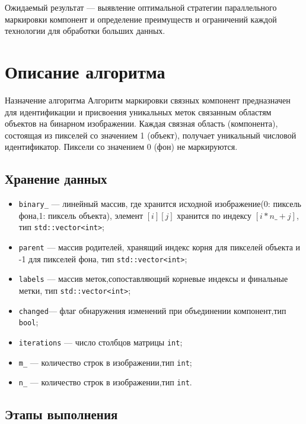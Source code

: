 \documentclass[12pt]{extarticle}
\begin{document}
Ожидаемый результат — выявление оптимальной стратегии параллельного маркировки компонент и определение преимуществ и ограничений каждой технологии для обработки больших данных.


\section{Описание алгоритма}

\hspace*{1.25cm}Назначение алгоритма Алгоритм маркировки связных компонент предназначен для идентификации и присвоения уникальных меток связанным областям объектов на бинарном изображении. Каждая связная область (компонента), состоящая из пикселей со значением 1 (объект), получает уникальный числовой идентификатор. Пиксели со значением 0 (фон) не маркируются.

\subsection{Хранение данных}

\begin{itemize}
    \item \texttt{binary\_} — линейный массив, где хранится исходной изображение(0: пиксель фона,1: пиксель объекта), элемент  $[i][j]$ хранится по индексу $[i * n\_ + j]$, тип  \texttt{std::vector<int>}; \\[-0.9cm]
    \item \texttt{parent} — массив родителей, хранящий индекс корня для пикселей объекта и -1 для пикселей фона, тип \texttt{std::vector<int>}; \\[-0.9cm]
    \item \texttt{labels} — массив меток,сопоставляющий корневые индексы и финальные метки, тип \texttt{std::vector<int>}; \\[-0.9cm]
    \item \texttt{changed}— флаг обнаружения изменений при объединении компонент,тип \texttt{bool}; \\[-0.9cm]
    \item \texttt{iterations} — число столбцов матрицы \texttt{int}; \\[-0.9cm]
    \item \texttt{m\_} — количество строк в изображении,тип \texttt{int};
    \item \texttt{n\_} — количество строк в изображении,тип \texttt{int}.
\end{itemize}


\subsection{Этапы выполнения}
\end{document}
